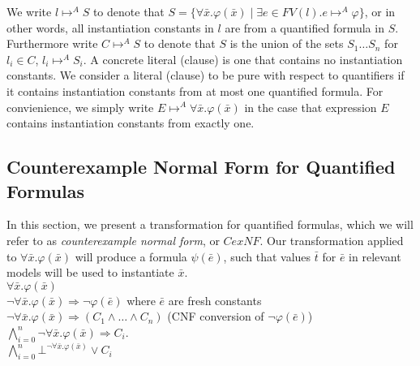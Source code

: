 \documentclass{llncs}
\begin{document}

We write $l \mapsto^A S$ to denote that $S = \{ \forall \bar{x}. \varphi( \bar{x} ) \mid \exists e \in FV( l ). e \mapsto^A \varphi \}$, or in other words, all instantiation constants in $l$ are from a quantified formula in $S$.
Furthermore write $C \mapsto^A S$ to denote that $S$ is the union of the sets $S_1 \ldots S_n$ for $l_i \in C$, $l_i \mapsto^A S_i$.
A concrete literal (clause) is one that contains no instantiation constants.
We consider a literal (clause) to be pure with respect to quantifiers if it contains instantiation constants from at most one quantified formula.
For convienience, we simply write $E \mapsto^A \forall \bar{x}. \varphi( \bar{x} )$ in the case that expression $E$ contains instantiation constants from exactly one.

\subsection{Counterexample Normal Form for Quantified Formulas}
\label{sec:CENF}

In this section, we present a transformation for quantified formulas, which we will refer to as \emph{counterexample normal form}, or $CexNF$.
Our transformation applied to $\forall \bar{x}. \varphi( \bar{ x } )$ will produce a formula $\psi( \bar{e} )$, such that values $\bar{t}$ for $\bar{e}$ in relevant models will be used to instantiate $\bar{x}$. \\

\noindent $\forall \bar{x}. \varphi( \bar{ x } )$ \\
$\neg \forall \bar{x}. \varphi( \bar{ x } ) \Rightarrow \neg \varphi( \bar{e} )$  where $\bar{e}$ are fresh constants \\
$\neg \forall \bar{x}. \varphi( \bar{ x } ) \Rightarrow (C_1 \wedge \ldots \wedge C_n )$ (CNF conversion of $\neg \varphi( \bar{ e } )$) \\
$\displaystyle\bigwedge\limits_{i=0}^n \neg \forall \bar{x}. \varphi( \bar{ x } ) \Rightarrow C_i$. \\
$\displaystyle\bigwedge\limits_{i=0}^n \bot^{\neg \forall \bar{x}. \varphi( \bar{ x } )} \vee C_i$ \\
\end{document}
